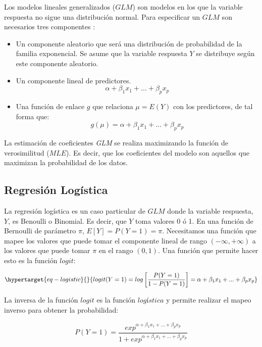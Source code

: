 \documentclass[
  12pt,
  a4paper,
  extrafontsizes,
  onecolumn,
  openright,
  table]{memoir}
\begin{document}
Los modelos lineales generalizados (\(GLM\)) son modelos en los que la
variable respuesta no sigue una distribución normal. Para especificar un
\(GLM\) son necesarios tres componentes
\autocite[ver][pp.~66-67]{agresti_2018}:

\begin{itemize}
\item
  Un componente aleatorio que será una distribución de probabilidad de
  la familia exponencial. Se asume que la variable respuesta \(Y\) se
  distribuye según este componente aleatorio.
\item
  Un componente lineal de predictores. \[
  \alpha+\beta_1x_1+...+\beta_px_p
  \]
\item
  Una función de enlace \(g\) que relaciona \(\mu=E(Y)\) con los
  predictores, de tal forma que: \[
  g(\mu)=\alpha+\beta_1x_1+...+\beta_px_p
  \]
\end{itemize}

La estimación de coeficientes \emph{GLM} se realiza maximizando la
función de verosimilitud (\(MLE\)). Es decir, que los coeficientes del
modelo son aquellos que maximizan la probabilidad de los datos.

\hypertarget{sec-logistica}{%
\subsection{Regresión Logística}\label{sec-logistica}}

La regresión logística \autocite[ver][pp.~68-69]{agresti_2018} es un
caso particular de \(GLM\) donde la variable respuesta, \(Y\), es
Benoulli o Binomial. Es decir, que \(Y\) toma valores 0 ó 1. En una
función de Bernoulli de parámetro \(\pi\), \(E[Y] = P(Y=1) = \pi\).
Necesitamos una función que mapee los valores que puede tomar el
componente lineal de rango \((-\infty, +\infty)\) a los valores que
puede tomar \(\pi\) en el rango \((0, 1)\). Una función que permite
hacer esto es la función \(logit\):

\begin{equation}\protect\hypertarget{eq-logistic}{}{
logit(Y=1) = log \left[\frac{P(Y=1)}{1-P(Y=1)} \right] = \alpha+\beta_1x_1+...+\beta_px_p
}\label{eq-logistic}\end{equation}

La inversa de la función \(logit\) es la función \(logística\) y permite
realizar el mapeo inverso para obtener la probabilidad:

\[
P(Y=1) = \frac{exp^{\alpha+\beta_1x_1+...+\beta_px_p}}{1 + exp^{\alpha+\beta_1x_1+...+\beta_px_p}}
\]
\end{document}
